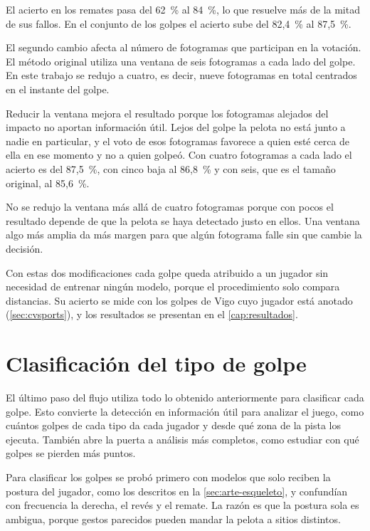 El acierto en los remates pasa del 62~\% al 84~\%, lo que resuelve más de la mitad de sus fallos.
En el conjunto de los golpes el acierto sube del 82,4~\% al 87,5~\%.

El segundo cambio afecta al número de fotogramas que participan en la votación.
El método original utiliza una ventana de seis fotogramas a cada lado del golpe.
En este trabajo se redujo a cuatro, es decir, nueve fotogramas en total centrados en el instante del golpe.

Reducir la ventana mejora el resultado porque los fotogramas alejados del impacto no aportan información útil.
Lejos del golpe la pelota no está junto a nadie en particular, y el voto de esos fotogramas favorece a quien esté cerca de ella en ese momento y no a quien golpeó.
Con cuatro fotogramas a cada lado el acierto es del 87,5~\%, con cinco baja al 86,8~\% y con seis, que es el tamaño original, al 85,6~\%.

No se redujo la ventana más allá de cuatro fotogramas porque con pocos el resultado depende de que la pelota se haya detectado justo en ellos.
Una ventana algo más amplia da más margen para que algún fotograma falle sin que cambie la decisión.

Con estas dos modificaciones cada golpe queda atribuido a un jugador sin necesidad de entrenar ningún modelo, porque el procedimiento solo compara distancias.
Su acierto se mide con los golpes de Vigo cuyo jugador está anotado (\cref{sec:cvsports}), y los resultados se presentan en el \cref{cap:resultados}.

\section{Clasificación del tipo de golpe}
\label{sec:tipo}

El último paso del flujo utiliza todo lo obtenido anteriormente para clasificar cada golpe.
Esto convierte la detección en información útil para analizar el juego, como cuántos golpes de cada tipo da cada jugador y desde qué zona de la pista los ejecuta.
También abre la puerta a análisis más completos, como estudiar con qué golpes se pierden más puntos.

Para clasificar los golpes se probó primero con modelos que solo reciben la postura del jugador, como los descritos en la \cref{sec:arte-esqueleto}, y confundían con frecuencia la derecha, el revés y el remate.
La razón es que la postura sola es ambigua, porque gestos parecidos pueden mandar la pelota a sitios distintos.

